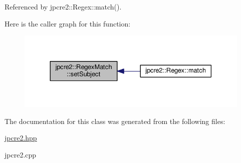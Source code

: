 Referenced by jpcre2\+::\+Regex\+::match().



Here is the caller graph for this function\+:\nopagebreak
\begin{figure}[H]
\begin{center}
\leavevmode
\includegraphics[width=330pt]{classjpcre2_1_1RegexMatch_a635c652195deaa8ebb9e107c4f972aab_icgraph}
\end{center}
\end{figure}




The documentation for this class was generated from the following files\+:\begin{DoxyCompactItemize}
\item 
\hyperlink{jpcre2_8hpp}{jpcre2.\+hpp}\item 
jpcre2.\+cpp\end{DoxyCompactItemize}
